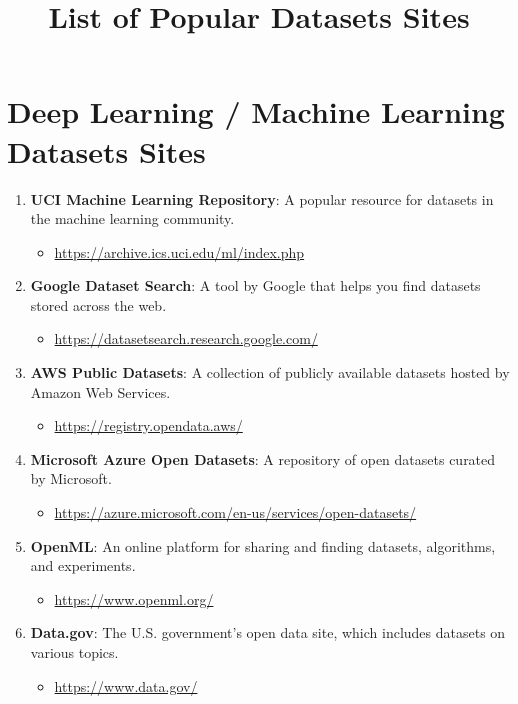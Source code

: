 \documentclass{article}
\begin{document}
\title{List of Popular Datasets Sites}
\author{}
\date{}
\maketitle

\section{Deep Learning / Machine Learning Datasets Sites}
\begin{enumerate}
    \item \textbf{UCI Machine Learning Repository}: A popular resource for datasets in the machine learning community.
    \begin{itemize}
        \item \url{https://archive.ics.uci.edu/ml/index.php}
    \end{itemize}

    \item \textbf{Google Dataset Search}: A tool by Google that helps you find datasets stored across the web.
    \begin{itemize}
        \item \url{https://datasetsearch.research.google.com/}
    \end{itemize}

    \item \textbf{AWS Public Datasets}: A collection of publicly available datasets hosted by Amazon Web Services.
    \begin{itemize}
        \item \url{https://registry.opendata.aws/}
    \end{itemize}

    \item \textbf{Microsoft Azure Open Datasets}: A repository of open datasets curated by Microsoft.
    \begin{itemize}
        \item \url{https://azure.microsoft.com/en-us/services/open-datasets/}
    \end{itemize}

    \item \textbf{OpenML}: An online platform for sharing and finding datasets, algorithms, and experiments.
    \begin{itemize}
        \item \url{https://www.openml.org/}
    \end{itemize}

    \item \textbf{Data.gov}: The U.S. government's open data site, which includes datasets on various topics.
    \begin{itemize}
        \item \url{https://www.data.gov/}
    \end{itemize}


\end{enumerate}
\end{document}
